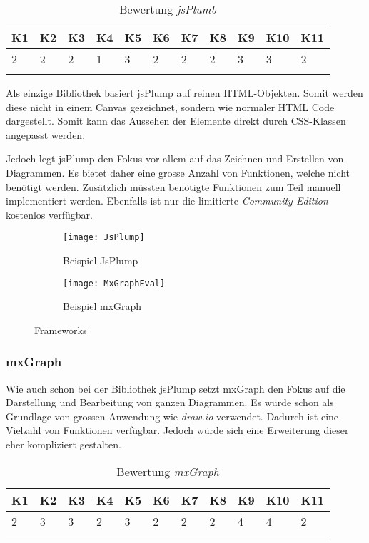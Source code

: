 \begin{longtable}{|p{0.5cm}|p{0.5cm}|p{0.5cm}|p{0.5cm}|p{0.5cm}|p{0.5cm}|p{0.5cm}|p{0.5cm}|p{0.5cm}|p{0.7cm}|p{0.7cm}|}
  \hline
    K1 & K2 & K3 & K4 & K5 & K6 & K7 & K8 & K9 & K10 & K11 \\\hline
    2 & 2 & 2 & 1 & 3 & 2 & 2 & 2 & 3 & 3 & 2\\\hline
    \caption{Bewertung \textit{jsPlumb}}
  \label{tab:bewertung-jsplumb}
\end{longtable}

Als einzige Bibliothek basiert jsPlump auf reinen \gls{HTML}-Objekten. Somit werden diese nicht in einem \gls{Canvas} gezeichnet, sondern wie normaler \gls{HTML} Code dargestellt. Somit kann das Aussehen der Elemente direkt durch \gls{CSS}-Klassen angepasst werden. 

\clearpage

Jedoch legt jsPlump den Fokus vor allem auf das Zeichnen und Erstellen von Diagrammen. Es bietet daher eine grosse Anzahl von Funktionen, welche nicht benötigt werden. Zusätzlich müssten benötigte Funktionen zum Teil manuell implementiert werden. Ebenfalls ist nur die limitierte \textit{Community Edition} kostenlos verfügbar. \citep{jsplump}

\begin{figure}
\centering
\begin{subfigure}[b]{0.5\textwidth}
   \texttt{[image: JsPlump]}
\caption{Beispiel JsPlump}
\label{fig:bsp-jsplump}
    \end{subfigure}
\begin{subfigure}[b]{0.4\textwidth}
\texttt{[image: MxGraphEval]}
\caption{Beispiel mxGraph}
\label{fig:bsp-mxgraph}
    \end{subfigure}
    \caption{Frameworks}
\end{figure}



\subsubsection{mxGraph}
Wie auch schon bei der Bibliothek jsPlump setzt mxGraph den Fokus auf die Darstellung und Bearbeitung von ganzen Diagrammen. Es wurde schon als Grundlage von grossen Anwendung wie \textit{draw.io} verwendet. Dadurch ist eine Vielzahl von Funktionen verfügbar. Jedoch würde sich eine Erweiterung dieser eher kompliziert gestalten. \citep{mxGraph}

\begin{longtable}{|p{0.5cm}|p{0.5cm}|p{0.5cm}|p{0.5cm}|p{0.5cm}|p{0.5cm}|p{0.5cm}|p{0.5cm}|p{0.5cm}|p{0.7cm}|p{0.7cm}|}
  \hline
    K1 & K2 & K3 & K4 & K5 & K6 & K7 & K8 & K9 & K10 & K11 \\\hline
    2 & 3 & 3 & 2 & 3 & 2 & 2 & 2 & 4 & 4 & 2\\\hline
    \caption{Bewertung \textit{mxGraph}}
  \label{tab:bewertung-mxgraph}
\end{longtable}
